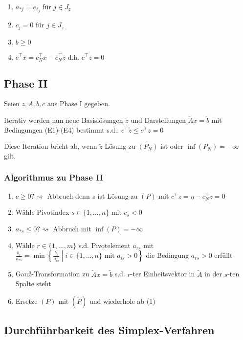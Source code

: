 \begin{enumerate}[label=(E\arabic*)]
	\item \(a_{*j} = e_{\ell_j}\) für \(j \in J_z\)
	\item \(c_j = 0\) für \(j \in J_z\)
	\item \(b \geq 0\)
	\item \(c^\top x = c_N^\top x - c_N^\top z\) d.h. \(c^\top z = 0\)
\end{enumerate}

\subsection*{Phase II}

Seien \(z, A, b, c\) aus Phase I gegeben.

Iterativ werden nun neue Basislösungen \(\tilde z\) und Darstellungen \(\tilde A x = \tilde b\) mit Bedingungen (E1)-(E4) bestimmt s.d.: \(c^\top \tilde z \leq c^\top z = 0\)

Diese Iteration bricht ab, wenn \(\tilde z\) Lösung zu \((P_N)\) ist oder \(\inf (P_N) = -\infty\) gilt.

\subsubsection*{Algorithmus zu Phase II}

\begin{enumerate}[label=(\arabic*)]
	\item \(c \geq 0? \rightsquigarrow\) Abbruch denn \(z\) ist Lösung zu \((P)\) mit \(c^\top z = \eta - c_N^\top z = 0\)
	\item Wähle Pivotindex \(s \in \{1,\dots,n\}\) mit \(c_s < 0\)
	\item \(a_{*s} \leq 0? \rightsquigarrow\) Abbruch mit \(\inf (P) = -\infty\)
	\item Wähle \(r \in \{1,\dots,m\}\) s.d. Pivotelement \(a_{rs}\) mit \(\frac{b_r}{a_{rs}} = \min \left\{ \frac{b_i}{a_{is}} \middle| i \in \{1,\dots,n\} \text{ mit } a_{is} > 0 \right\}\) die Bedingung \(a_{rs} > 0\) erfüllt
	\item Gauß-Transformation zu \(\tilde A x = \tilde b\) s.d. \(r\)-ter Einheitsvektor in \(\tilde A\) in der \(s\)-ten Spalte steht
	\item Ersetze \((P)\) mit \((\tilde P)\) und wiederhole ab (1)
\end{enumerate}

\subsection*{Durchführbarkeit des Simplex-Verfahren}

